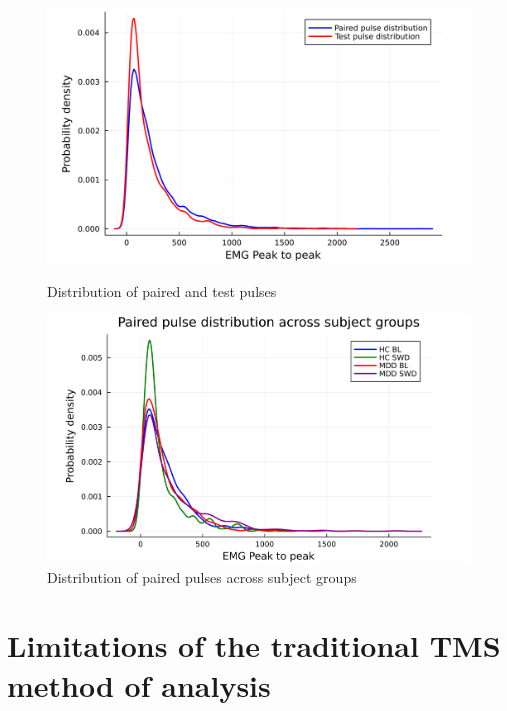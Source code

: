 \documentclass{article}
\begin{document}
\begin{multicols}{2}
\begin{figure}
  \begin{minipage}[b]{0.48\linewidth}
    \centering
    \includegraphics[width=\linewidth]{Paired-TestDist}
    \caption{Distribution of paired and test pulses}
    \label{fig:figure1}
  \end{minipage}
  \hspace{0.04\linewidth}
  \begin{minipage}[b]{0.48\linewidth}
    \centering
    \includegraphics[width=\linewidth]{P-dist-subjects-big}
    \caption{Distribution of paired pulses across subject groups}
    \label{fig:figure2}
  \end{minipage}
\end{figure}



\section{Limitations of the traditional TMS method of analysis}



\end{multicols}
\end{document}

